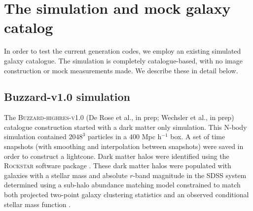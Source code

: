 \section{The simulation and mock galaxy catalog}
\label{sec:sims}

In order to test the current generation codes, we employ an existing simulated galaxy catalogue. The simulation is completely catalogue-based, with no image construction or mock measurements made. We describe these in detail below.

\subsection{Buzzard-v1.0 simulation}
\label{sec:buzzard}
The \textsc{Buzzard-highres-v1.0} (De Rose et al., in prep; Wechsler et al., in prep) catalogue construction started with a dark matter only simulation. This N-body simulation contained $2048^3$ particles in a $400$ Mpc h$^{-1}$ box. A set of time snapshots (with smoothing and interpolation between snapshots) were saved in order to construct a lightcone. Dark matter halos were identified using the \textsc{Rockstar} software package \citep{Behroozi:13}. These dark matter halos were populated with galaxies with a stellar mass and absolute $r$-band magnitude in the SDSS system determined using a sub-halo abundance matching model constrained to match both projected two-point galaxy clustering statistics and an observed conditional stellar mass function \citep{Reddick:13}.

